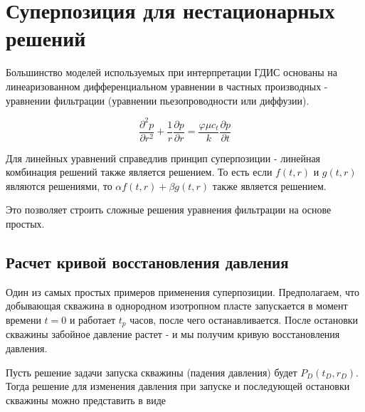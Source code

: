 %
%
%
%


\section{Суперпозиция для нестационарных решений}


Большинство моделей используемых при интерпретации ГДИС основаны на линеаризованном дифференциальном уравнении в частных производных - уравнении фильтрации (уравнении пьезопроводности или диффузии).

$$ \frac{\partial ^2 p }{\partial r^2} + \frac{1}{r} \frac{\partial p}{\partial r} = \frac{\varphi \mu c_t}{k} \frac{\partial p}{\partial t} $$

Для линейных уравнений справедлив принцип суперпозиции - линейная комбинация решений также является решением. То есть если $f(t,r)$ и $g(t,r)$ являются решениями, то $\alpha f(t,r) + \beta g(t,r)$  также является решением.

Это позволяет строить сложные решения уравнения фильтрации на основе простых.

\subsection{Расчет кривой восстановления давления}

Один из самых простых примеров применения суперпозиции. Предполагаем, что добывающая скважина в однородном изотропном пласте запускается в момент времени $t=0$ и работает $t_{p}$ часов, после чего останавливается. После остановки скважины забойное давление растет - и мы получим кривую восстановления давления.

Пусть решение задачи запуска скважины (падения давления) будет $P_D(t_D, r_D)$. Тогда решение для изменения давления при запуске и последующей остановки скважины можно представить в виде 

